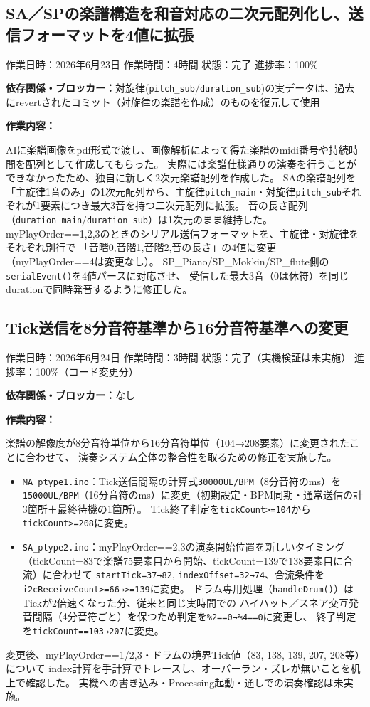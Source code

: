 \documentclass[uplatex,dvipdfmx]{jlreq}
\begin{document}
\subsection{SA／SPの楽譜構造を和音対応の二次元配列化し、送信フォーマットを4値に拡張}
\noindent
作業日時：2026年6月23日 \quad 作業時間：4時間
状態：完了 \quad 進捗率：100\%

\noindent
\textbf{依存関係・ブロッカー：}対旋律(\texttt{pitch\_sub}/\texttt{duration\_sub})の実データは、過去にrevertされたコミット（対旋律の楽譜を作成）のものを復元して使用

\noindent
\textbf{作業内容：}

AIに楽譜画像をpdf形式で渡し、画像解析によって得た楽譜のmidi番号や持続時間を配列として作成してもらった。
実際には楽譜仕様通りの演奏を行うことができなかったため、独自に新しく2次元楽譜配列を作成した。
SAの楽譜配列を「主旋律1音のみ」の1次元配列から、主旋律\texttt{pitch\_main}・対旋律\texttt{pitch\_sub}それぞれが1要素につき最大3音を持つ二次元配列に拡張。
音の長さ配列（\texttt{duration\_main}/\texttt{duration\_sub}）は1次元のまま維持した。
myPlayOrder==1,2,3のときのシリアル送信フォーマットを、主旋律・対旋律をそれぞれ別行で
「音階0,音階1,音階2,音の長さ」の4値に変更（myPlayOrder==4は変更なし）。
SP\_Piano/SP\_Mokkin/SP\_flute側の\texttt{serialEvent()}を4値パースに対応させ、
受信した最大3音（0は休符）を同じdurationで同時発音するように修正した。

\subsection{Tick送信を8分音符基準から16分音符基準への変更}
\noindent
作業日時：2026年6月24日 \quad 作業時間：3時間
状態：完了（実機検証は未実施） \quad 進捗率：100\%（コード変更分）

\noindent
\textbf{依存関係・ブロッカー：}なし

\noindent
\textbf{作業内容：}

楽譜の解像度が8分音符単位から16分音符単位（104→208要素）に変更されたことに合わせて、
演奏システム全体の整合性を取るための修正を実施した。
\begin{itemize}
    \item \texttt{MA\_ptype1.ino}：Tick送信間隔の計算式\texttt{30000UL/BPM}（8分音符のms）を
    \texttt{15000UL/BPM}（16分音符のms）に変更（初期設定・BPM同期・通常送信の計3箇所＋最終待機の1箇所）。
    Tick終了判定を\texttt{tickCount>=104}から\texttt{tickCount>=208}に変更。
    \item \texttt{SA\_ptype2.ino}：myPlayOrder==2,3の演奏開始位置を新しいタイミング（tickCount=83で楽譜75要素目から開始、tickCount=139で138要素目に合流）に合わせて
    \texttt{startTick=37→82}, \texttt{indexOffset=32→74}、合流条件を\texttt{i2cReceiveCount>=66→>=139}に変更。
    ドラム専用処理（\texttt{handleDrum()}）はTickが2倍速くなった分、従来と同じ実時間での
    ハイハット／スネア交互発音間隔（4分音符ごと）を保つため判定を\texttt{\%2==0→\%4==0}に変更し、
    終了判定を\texttt{tickCount==103→207}に変更。
\end{itemize}
変更後、myPlayOrder==1/2,3・ドラムの境界Tick値（83, 138, 139, 207, 208等）について
index計算を手計算でトレースし、オーバーラン・ズレが無いことを机上で確認した。
実機への書き込み・Processing起動・通しでの演奏確認は未実施。
\end{document}
